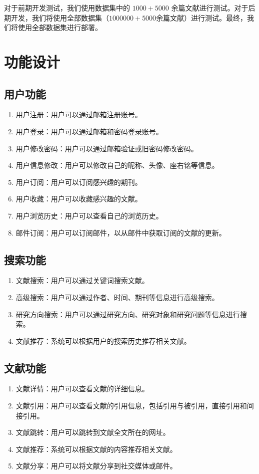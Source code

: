 \documentclass[UTF8,openany]{ctexbook}
\begin{document}
对于前期开发测试，我们使用数据集中的 $1000+5000$ 余篇文献进行测试。对于后期开发，我们将使用全部数据集（$1000000+5000$余篇文献）进行测试。最终，我们将使用全部数据集进行部署。

\chapter{功能设计}

\section{用户功能}

\begin{enumerate}
    \item 用户注册：用户可以通过邮箱注册账号。
    \item 用户登录：用户可以通过邮箱和密码登录账号。
    \item 用户修改密码：用户可以通过邮箱验证或旧密码修改密码。
    \item 用户信息修改：用户可以修改自己的昵称、头像、座右铭等信息。
    \item 用户订阅：用户可以订阅感兴趣的期刊。
    \item 用户收藏：用户可以收藏感兴趣的文献。
    \item 用户浏览历史：用户可以查看自己的浏览历史。
    \item 邮件订阅：用户可以订阅邮件，以从邮件中获取订阅的文献的更新。
\end{enumerate}

\section{搜索功能}

\begin{enumerate}
    \item 文献搜索：用户可以通过关键词搜索文献。
    \item 高级搜索：用户可以通过作者、时间、期刊等信息进行高级搜索。
    \item 研究方向搜索：用户可以通过研究方向、研究对象和研究问题等信息进行搜索。
    \item 文献推荐：系统可以根据用户的搜索历史推荐相关文献。
\end{enumerate}

\section{文献功能}

\begin{enumerate}
    \item 文献详情：用户可以查看文献的详细信息。
    \item 文献引用：用户可以查看文献的引用信息，包括引用与被引用，直接引用和间接引用。
    \item 文献跳转：用户可以跳转到文献全文所在的网址。
    \item 文献推荐：系统可以根据文献的内容推荐相关文献。
    \item 文献分享：用户可以将文献分享到社交媒体或邮件。
\end{enumerate}
\end{document}
